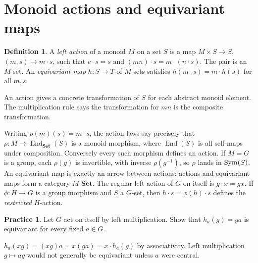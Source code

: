 \documentclass[11pt,openany]{book}
\newcommand{\End}{\operatorname{End}}\newcommand{\im}{\operatorname{im}}
\theoremstyle{definition}
\newtheorem{definition}[theorem]{Definition}
\newtheorem{exercise}[theorem]{Practice}
\begin{document}
\section{Monoid actions and equivariant maps}
\begin{definition}A \emph{left action} of a monoid $M$ on a set $S$ is a map $M\times S\to S$, $(m,s)\mapsto m\cdot s$, such that $e\cdot s=s$ and $(mn)\cdot s=m\cdot(n\cdot s)$. The pair is an $M$-set. An \emph{equivariant map} $h:S\to T$ of $M$-sets satisfies $h(m\cdot s)=m\cdot h(s)$ for all $m,s$.\end{definition}
\begin{intuition}An action gives a concrete transformation of $S$ for each abstract monoid element. The multiplication rule says the transformation for $mn$ is the composite transformation.\end{intuition}
Writing $\rho(m)(s)=m\cdot s$, the action laws say precisely that $\rho:M\to\End_{\mathbf{Set}}(S)$ is a monoid morphism, where $\End(S)$ is all self-maps under composition. Conversely every such morphism defines an action. If $M=G$ is a group, each $\rho(g)$ is invertible, with inverse $\rho(g^{-1})$, so $\rho$ lands in $\operatorname{Sym}(S)$. An equivariant map is exactly an arrow between actions; actions and equivariant maps form a category $M\text{-}\mathbf{Set}$. The regular left action of $G$ on itself is $g\cdot x=gx$. If $\phi:H\to G$ is a group morphism and $S$ a $G$-set, then $h\cdot s=\phi(h)\cdot s$ defines the \emph{restricted} $H$-action.
\begin{exercise}Let $G$ act on itself by left multiplication. Show that $h_a(g)=ga$ is equivariant for every fixed $a\in G$.\end{exercise}
\begin{solution}$h_a(xg)=(xg)a=x(ga)=x\cdot h_a(g)$ by associativity. Left multiplication $g\mapsto ag$ would not generally be equivariant unless $a$ were central.\end{solution}
\end{document}
